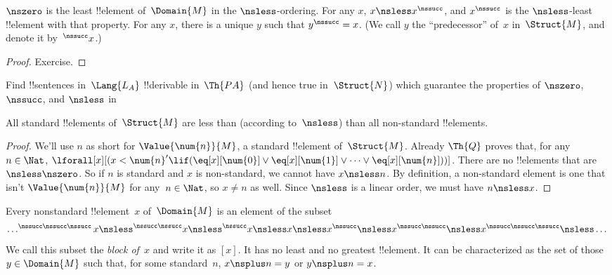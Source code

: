 \documentclass[../../../include/open-logic-section]{subfiles}
\begin{document}
\begin{prop}
 $\nszero$ is the least !!{element}
of~$\Domain{M}$ in the $\nsless$-ordering. For any $x$, $x \nsless
x^\nssucc$, and $x^\nssucc$ is the $\nsless$-least !!{element} with
that property.  For any $x$, there is a unique $y$ such that
$y^\nssucc = x$. (We call $y$ the ``predecessor'' of~$x$
in~$\Struct{M}$, and denote it by~$^\nssucc x$.)
\end{prop}

\begin{proof}
Exercise.  
\end{proof}

\begin{prob}
Find !!{sentence}s in~$\Lang{L_A}$ !!{derivable} in~$\Th{PA}$ (and
hence true in~$\Struct{N}$) which guarantee the properties of
$\nszero$, $\nssucc$, and $\nsless$ in
\end{prob}

\begin{prop}
All standard !!{element}s of~$\Struct{M}$ are less than (according
to~$\nsless$) than all non-standard !!{element}s.
\end{prop}

\begin{proof}
We'll use $n$ as short for $\Value{\num{n}}{M}$, a standard
!!{element} of~$\Struct{M}$.  Already $\Th{Q}$ proves that, for any~$n
\in \Nat$, $\lforall[x][(x < \num{n}' \lif (\eq[x][\num{0}] \lor
  \eq[x][\num{1}] \lor \dots \lor \eq[x][\num{n}]))]$. There are no
!!{element}s that are $\nsless \nszero$. So if $n$ is standard and $x$
is non-standard, we cannot have $x \nsless n$. By definition, a
non-standard element is one that isn't $\Value{\num{n}}{M}$ for any~$n
\in \Nat$, so $x \neq n$ as well. Since $\nsless$ is a linear order,
we must have $n \nsless x$.
\end{proof}

\begin{prop}
Every nonstandard !!{element}~$x$ of~$\Domain{M}$ is an element of the subset
\[
\dots ^{\nssucc\nssucc\nssucc}x \nsless ^{\nssucc\nssucc}x \nsless
^{\nssucc}x \nsless x \nsless x^{\nssucc} \nsless x^{\nssucc\nssucc}
\nsless x^{\nssucc\nssucc\nssucc} \nsless \dots
\]
We call this subset the \emph{block of~$x$} and write it as $[x]$. It
has no least and no greatest !!{element}. It can be characterized as
the set of those $y \in \Domain{M}$ such that, for some standard~$n$,
$x \nsplus n = y$ or $y \nsplus n = x$.
\end{prop}
\end{document}
